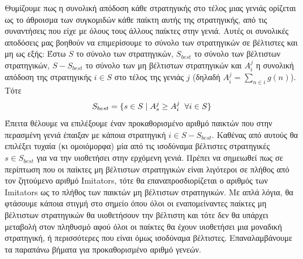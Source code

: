 \documentclass[12pt]{report}
\begin{document}
Θυμίζουμε πως η συνολική απόδοση κάθε στρατηγικής στο τέλος μιας γενιάς ορίζεται ως το άθροισμα των συγκομιδών κάθε παίκτη αυτής της στρατηγικής, από τις συναντήσεις που είχε με όλους τους άλλους παίκτες στην γενιά. Αυτές οι συνολικές αποδόσεις μας βοηθούν να επιμερίσουμε το σύνολο των στρατηγικών σε βέλτιστες και μη ως εξής:
Έστω $S$ το σύνολο των στρατηγικών, $S_{best}$ το σύνολο των βέλτιστων στρατηγικών, $S - S_{best}$ το σύνολο των μη βέλτιστων στρατηγικών και $A_i^j$ η συνολική απόδοση της στρατηγικής $i \in S$ στο τέλος της γενιάς $j$ (δηλαδή $A_i^j = \sum_{n \in i} g(n)$). Τότε
\begin{equation}
    \label{beststrats}
    S_{best}=\{s \in S \mid A_s^j \geq A_i^j \hspace{0.2 cm} \forall i \in S\}
\end{equation}
Έπειτα θέλουμε να επιλέξουμε έναν προκαθορισμένο αριθμό παικτών που στην περασμένη γενιά έπαιξαν με κάποια στρατηγική $i \in S-S_{best}$. Καθένας από αυτούς θα επιλέξει τυχαία (κι ομοιόμορφα) μία από τις ισοδύναμα βέλτιστες στρατηγικές $s \in S_{best}$ για να την υιοθετήσει στην ερχόμενη γενιά. Πρέπει να σημειωθεί πως σε περίπτωση που οι παίκτες μη βέλτιστων στρατηγικών είναι λιγότεροι σε πλήθος από τον ζητούμενο αριθμό \foreignlanguage{english}{Imitators}, τότε θα επαναπροσδιορίζεται ο αριθμός των \foreignlanguage{english}{Imitators} ως το πλήθος των παικτών μη βέλτιστων στρατηγικών. Με απλά λόγια, θα φτάσουμε κάποια στιγμή στο σημείο όπου όλοι οι εναπομείναντες παίκτες μη βέλτιστων στρατηγικών θα υιοθετήσουν την βέλτιστη και τότε δεν θα υπάρχει μεταβολή στον πληθυσμό αφού όλοι οι παίκτες θα έχουν υιοθετήσει μια μοναδική στρατηγική, ή περισσότερες που είναι όμως ισοδύναμα βέλτιστες. Επαναλαμβάνουμε τα παραπάνω βήματα για προκαθορισμένο αριθμό γενεών.
\end{document}
